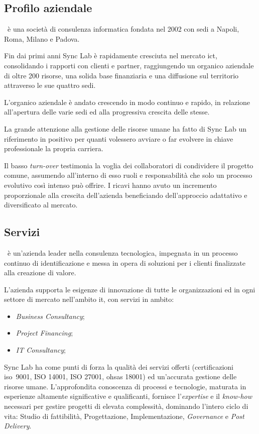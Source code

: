 \subsection{Profilo aziendale}
\myCompany\ è una società di consulenza informatica fondata nel 2002 con sedi a Napoli, Roma, Milano e Padova.

Fin dai primi anni Sync Lab è rapidamente cresciuta nel mercato \gls{ict}, consolidando i rapporti con clienti e partner, raggiungendo un organico aziendale di oltre 200 risorse,
una solida base finanziaria e una diffusione sul territorio attraverso le sue quattro sedi.

L'organico aziendale è andato crescendo in modo continuo e rapido, in relazione
all'apertura delle varie sedi ed alla progressiva crescita delle stesse.

La grande attenzione alla gestione delle risorse umane ha fatto di Sync Lab un
riferimento in positivo per quanti volessero avviare o far evolvere in chiave professionale la propria carriera.

Il basso \textit{turn-over} testimonia la voglia dei collaboratori di condividere il progetto comune, assumendo all'interno di esso ruoli e responsabilità che solo un processo
evolutivo così intenso può offrire.
I ricavi hanno avuto un incremento proporzionale alla crescita dell'azienda beneficiando dell'approccio adattativo e diversificato al mercato.

\subsection{Servizi}

\myCompany\ è un'azienda leader nella consulenza tecnologica, impegnata in un
processo continuo di identificazione e messa in opera di soluzioni per i clienti finalizzate
alla creazione di valore.

L'azienda supporta le esigenze di innovazione di tutte le
organizzazioni ed in ogni settore di mercato nell'ambito \gls{it}, con
servizi in ambito:
\begin{itemize}
	\item \textit{Business Consultancy};
	\item \textit{Project Financing};
	\item \textit{IT Consultancy};
\end{itemize}

Sync Lab ha come punti di forza la qualità dei servizi offerti (certificazioni \acrshort{iso}\gloss\ 9001,
ISO 14001, ISO 27001, \acrshort{ohsas} 18001) ed un'accurata gestione delle risorse umane.
L'approfondita conoscenza di processi e tecnologie, maturata in esperienze altamente
significative e qualificanti, fornisce l'\textit{expertise} e il \textit{know-how} necessari per gestire
progetti di elevata complessità, dominando l'intero ciclo di vita: Studio di fattibilità,
Progettazione, Implementazione, \textit{Governance} e \textit{Post Delivery}.

